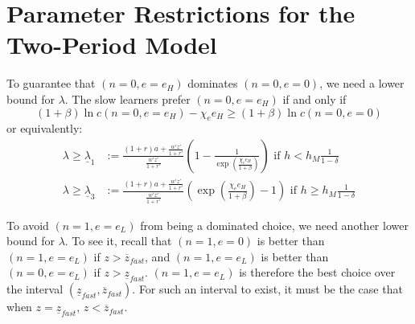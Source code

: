 \documentclass[12pt]{article}
\begin{document}
\printbibliography



\appendix

\section{Parameter Restrictions for the Two-Period Model}
To guarantee that $(n=0,e=e_H)$ dominates $(n=0,e=0)$, we need a lower bound for $\lambda$.
The slow learners prefer $(n=0,e=e_H)$ if and only if
\begin{equation*}
    (1+\beta)\ln c(n=0,e=e_H) - \chi_e e_H \geq (1+\beta)\ln c(n=0,e=0)
\end{equation*}
or equivalently:
\begin{align}
    \lambda \geq \underline{\lambda}_1&:=\frac{(1+r)a+\frac{w'z'}{1+r'}}{\frac{w'z'}{1+r'}}\left(1-\frac{1}{\exp(\frac{\chi_e e_H}{1+\beta})}\right) \text{ if } h<h_M\frac{1}{1-\delta} \label{app:lambda1} \\
    \lambda \geq \underline{\lambda}_3&:=\frac{(1+r)a+\frac{w'z'}{1+r'}}{\frac{w'z'}{1+r'}}\left(\exp(\frac{\chi_e e_H}{1+\beta})-1\right) \text{ if } h \geq h_M\frac{1}{1-\delta} \label{app:lambda3} 
\end{align}
    



To avoid $(n=1,e=e_L)$ from being a dominated choice, we need another lower bound for $\lambda$.
To see it, recall that $(n=1,e=0)$ is better than $(n=1,e=e_L)$ if $z>\overline{z}_{fast}$, and $(n=1,e=e_L)$ is better than $(n=0,e=e_L)$ if $z>\underline{z}_{fast}$. $(n=1,e=e_L)$ is therefore the best choice over the interval $(\underline{z}_{fast},\overline{z}_{fast})$. For such an interval to exist, it must be the case that when $z=\underline{z}_{fast}$, $z<\overline{z}_{fast}$.
\end{document}
